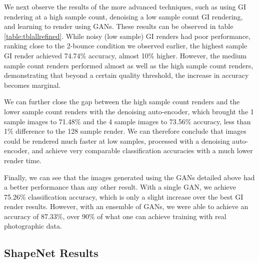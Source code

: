 \documentclass[10pt,twocolumn,letterpaper]{article}
\begin{document}
We next observe the results of the more advanced techniques, such as using GI rendering at a high sample count, denoising a low sample count GI rendering, and learning to render using GANs. These results can be observed in table \ref{table:tblallrefined}. While noisy (low sample) GI renders had poor performance, ranking close to the 2-bounce condition we observed earlier, the highest sample GI render achieved 74.74\% accuracy, almost 10\% higher. However, the medium sample count renders performed almost as well as the high sample count renders, demonstrating that beyond a certain quality threshold, the increase in accuracy becomes marginal. 

We can further close the gap between the high sample count renders and the lower sample count renders with the denoising auto-encoder, which brought the 1 sample images to 71.48\% and the 4 sample images to 73.56\% accuracy, less than 1\% difference to the 128 sample render. We can therefore conclude that images could be rendered much faster at low samples, processed with a denoising auto-encoder, and achieve very comparable classification accuracies with a much lower render time.

Finally, we can see that the images generated using the GANs detailed above had a better performance than any other result. With a single GAN, we achieve 75.26\% classification accuracy, which is only a slight increase over the best GI render results. However, with an ensemble of GANs, we were able to achieve an accuracy of 87.33\%, over 90\% of what one can achieve training with real photographic data.
\subsection{ShapeNet Results}
\end{document}
